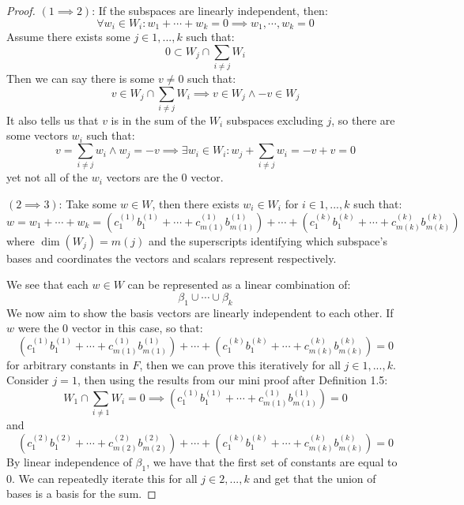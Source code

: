 \documentclass[10pt,letterpaper]{article} %
\begin{document}
\begin{proof}
$(1 \implies 2)$: If the subspaces are linearly independent, then:
\begin{equation*}
\forall w_i \in W_i: w_1 + \cdots + w_k = 0 \implies w_1, \cdots, w_k = 0
\end{equation*}
Assume there exists some $j \in 1, ..., k$ such that:
\begin{equation*}
0 \subset W_j \cap \sum_{i \neq j}W_i
\end{equation*}
Then we can say there is some $v \neq 0$ such that:
\begin{equation*}
v \in W_j \cap \sum_{i \neq j}W_i \implies v \in W_j \land -v \in W_j
\end{equation*}
It also tells us that $v$ is in the sum of the $W_i$ subspaces excluding $j$, so there are some vectors $w_i$ such that:
\begin{equation*}
v = \sum_{i \neq j}w_i \land w_j = -v \implies \exists w_i \in W_i: w_j + \sum_{i \neq j}w_i = -v + v = 0
\end{equation*}
yet not all of the $w_i$ vectors are the $0$ vector.

$(2 \implies 3)$: Take some $w \in W$, then there exists $w_i \in W_i$ for $i \in 1, ..., k$ such that:
\begin{equation*}
w = w_1 + \cdots + w_k = (c_1^{(1)}b_1^{(1)} + \cdots + c_{m(1)}^{(1)}b_{m(1)}^{(1)}) + \cdots + (c_1^{(k)}b_1^{(k)} + \cdots + c_{m(k)}^{(k)}b_{m(k)}^{(k)})
\end{equation*}
where $\dim(W_j) = m(j)$ and the superscripts identifying which subspace's bases and coordinates the vectors and scalars represent respectively.

We see that each $w \in W$ can be represented as a linear combination of:
\begin{equation*}
\beta_1 \cup \cdots \cup \beta_k
\end{equation*}
We now aim to show the basis vectors are linearly independent to each other. If $w$ were the $0$ vector in this case, so that:
\begin{equation*}
(c_1^{(1)}b_1^{(1)} + \cdots + c_{m(1)}^{(1)}b_{m(1)}^{(1)}) + \cdots + (c_1^{(k)}b_1^{(k)} + \cdots + c_{m(k)}^{(k)}b_{m(k)}^{(k)}) = 0
\end{equation*}
for arbitrary constants in $F$, then we can prove this iteratively for all $j \in 1, ..., k$. Consider $j = 1$, then using the results from our mini proof after Definition 1.5:
\begin{equation*}
W_1 \cap \sum_{i \neq 1}W_i = 0 \implies (c_1^{(1)}b_1^{(1)} + \cdots + c_{m(1)}^{(1)}b_{m(1)}^{(1)}) = 0
\end{equation*}
and
\begin{equation*}
(c_1^{(2)}b_1^{(2)} + \cdots + c_{m(2)}^{(2)}b_{m(2)}^{(2)}) + \cdots + (c_1^{(k)}b_1^{(k)} + \cdots + c_{m(k)}^{(k)}b_{m(k)}^{(k)}) = 0
\end{equation*}
By linear independence of $\beta_1$, we have that the first set of constants are equal to $0$. We can repeatedly iterate this for all $j \in 2, ..., k$ and get that the union of bases is a basis for the sum.


\end{proof}
\end{document}
